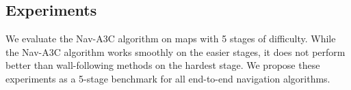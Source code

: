 \subsection{Experiments}
\label{sec:navtasks}
We evaluate the Nav-A3C algorithm on maps with 5 stages of difficulty. While the Nav-A3C algorithm works smoothly on the easier stages, it does not perform better than wall-following  methods on the hardest stage.
We propose these experiments as a 5-stage benchmark for all end-to-end navigation algorithms.


